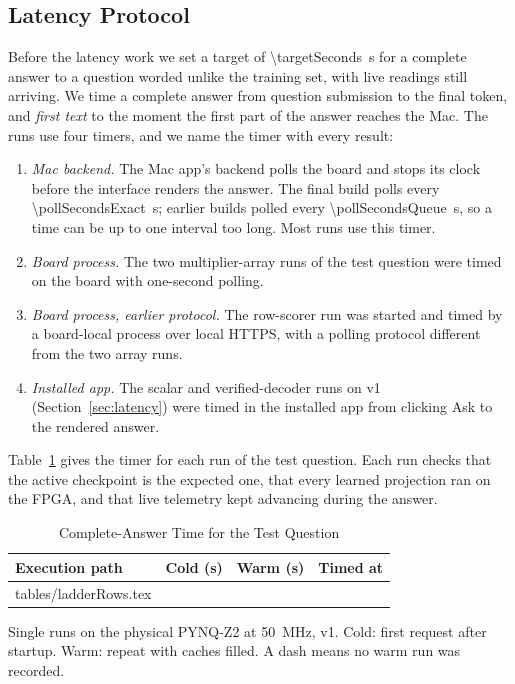 \documentclass[conference,10pt,letterpaper]{IEEEtran}
\makeatletter
\newcommand{\tablerows}[1]{\@@input #1 }
\newcommand{\tablenote}[1]{\begin{tablenotes}[flushleft]\footnotesize\item[] #1\end{tablenotes}}
\newcommand{\seconds}[1]{\SI{#1}{\second}}
\newcommand{\pynq}{\mbox{PYNQ-Z2}}
\makeatother
\begin{document}
\subsection{Latency Protocol}
Before the latency work we set a target of \seconds{\targetSeconds} for a complete answer to a question worded unlike the training set, with live readings still arriving. We time a complete answer from question submission to the final token, and \emph{first text} to the moment the first part of the answer reaches the Mac. The runs use four timers, and we name the timer with every result:
\begin{enumerate}
\item \emph{Mac backend.} The Mac app's backend polls the board and stops its clock before the interface renders the answer. The final build polls every \seconds{\pollSecondsExact}; earlier builds polled every \seconds{\pollSecondsQueue}, so a time can be up to one interval too long. Most runs use this timer.
\item \emph{Board process.} The two multiplier-array runs of the test question were timed on the board with one-second polling.
\item \emph{Board process, earlier protocol.} The row-scorer run was started and timed by a board-local process over local HTTPS, with a polling protocol different from the two array runs.
\item \emph{Installed app.} The scalar and verified-decoder runs on v1 (Section~\ref{sec:latency}) were timed in the installed app from clicking Ask to the rendered answer.
\end{enumerate}
Table~\ref{tab:ladder} gives the timer for each run of the test question. Each run checks that the active checkpoint is the expected one, that every learned projection ran on the FPGA, and that live telemetry kept advancing during the answer.

\begin{table}[t]
\centering
\caption{Complete-Answer Time for the Test Question}
\label{tab:ladder}
\footnotesize
\begin{threeparttable}
\begin{tabular}{@{}lcc>{\raggedright\arraybackslash}p{}@{}}
\toprule
Execution path & Cold (s) & Warm (s) & Timed at \\
\midrule
\tablerows{tables/ladderRows.tex}
\bottomrule
\end{tabular}
\tablenote{Single runs on the physical \pynq{} at \SI{50}{\mega\hertz}, v1. Cold: first request after startup. Warm: repeat with caches filled. A dash means no warm run was recorded.}
\end{threeparttable}
\end{table}
\end{document}
